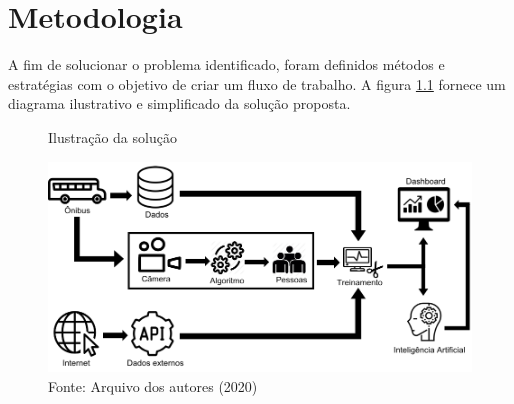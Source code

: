 \chapter{Metodologia}
\label{Cap:MateriaisMetodos}

\indent
\par A fim de solucionar o problema identificado, foram definidos métodos e estratégias com o objetivo de criar um fluxo de trabalho. A figura \ref{DiagramaDeBlocosIcones} fornece um diagrama ilustrativo e simplificado da solução proposta.

\begin{figure}[H]
    \centering
    \caption{Ilustração da solução}
    \includegraphics[width=1.0\linewidth]{Imagens/DiagramaDeBlocosIcones.png}
    \caption*{Fonte: Arquivo dos autores (2020)}
    \label{DiagramaDeBlocosIcones}
\end{figure}

